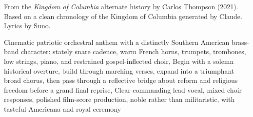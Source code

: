 
\begin{notes}
From the \emph{Kingdom of Columbia} alternate history by Carlos Thompson (2021). Based on a clean chronology of the Kingdom of Columbia generated by Claude. Lyrics by Suno.
\end{notes}
\begin{style}
Cinematic patriotic orchestral anthem with a distinctly Southern American brass-band character: stately snare cadence, warm French horns, trumpets, trombones, low strings, piano, and restrained gospel-inflected choir, Begin with a solemn historical overture, build through marching verses, expand into a triumphant broad chorus, then pass through a reflective bridge about reform and religious freedom before a grand final reprise, Clear commanding lead vocal, mixed choir responses, polished film-score production, noble rather than militaristic, with tasteful Americana and royal ceremony
\end{style}
